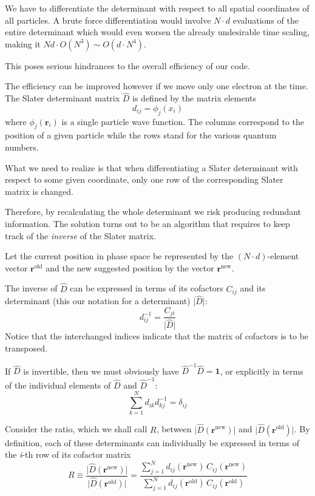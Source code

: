 We have to differentiate the determinant with respect to
all spatial coordinates of all particles. A brute force
differentiation would involve $N\cdot d$ evaluations of the entire
determinant which would even worsen the already undesirable time
scaling, making it $Nd\cdot O(N^3)\sim O(d\cdot N^4)$.

This poses serious hindrances to the overall efficiency of our code.

The efficiency can be improved however if we move only one electron at the time.
The Slater determinant matrix $\hat{D}$ is defined by the matrix elements
\[
d_{ij}=\phi_j(x_i)
\]
where $\phi_j(\mathbf{r}_i)$ is a single particle  wave function.
The columns correspond to the position of a given particle 
while the rows stand for the various quantum numbers.

What we need to realize is that when differentiating a Slater
determinant with respect to some given coordinate, only one row of the
corresponding Slater matrix is changed. 

Therefore, by recalculating
the whole determinant we risk producing redundant information. The
solution turns out to be an algorithm that requires to keep track of
the \emph{inverse} of the Slater matrix.

Let the current position in phase space be represented by the $(N\cdot d)$-element 
vector $\mathbf{r}^{\mathrm{old}}$ and the new suggested
position by the vector $\mathbf{r}^{\mathrm{new}}$.

The inverse of $\hat{D}$ can be expressed in terms of its
cofactors $C_{ij}$ and its determinant (this our notation for a determinant) $\vert\hat{D}\vert$:
\begin{equation}
d_{ij}^{-1} = \frac{C_{ji}}{\vert\hat{D}\vert}
\label{eq:inverse_cofactor}
\end{equation}
Notice that the interchanged indices indicate that the matrix of cofactors is to be transposed.

If $\hat{D}$ is invertible, then we must obviously have $\hat{D}^{-1}\hat{D}= \mathbf{1}$, or explicitly in terms of the individual
elements of $\hat{D}$ and $\hat{D}^{-1}$:
\begin{equation}
\sum_{k=1}^N d_{ik}^{\phantom X}d_{kj}^{-1} = \delta_{ij}^{\phantom X}
\label{eq:unity_explicitely}
\end{equation}

Consider the ratio, which we shall call $R$, between $\vert\hat{D}(\mathbf{r}^{\mathrm{new}})\vert$ and $\vert\hat{D}(\mathbf{r}^{\mathrm{old}})\vert$. 
By definition, each of these determinants can
individually be expressed in terms of the \emph{i}-th row of its cofactor
matrix
\begin{equation}
R\equiv\frac{\vert\hat{D}(\mathbf{r}^{\mathrm{new}})\vert}
{\vert\hat{D}(\mathbf{r}^{\mathrm{old}})\vert} =
\frac{\sum_{j=1}^N d_{ij}(\mathbf{r}^{\mathrm{new}})\,
C_{ij}(\mathbf{r}^{\mathrm{new}})}
{\sum_{j=1}^N d_{ij}(\mathbf{r}^{\mathrm{old}})\,
C_{ij}(\mathbf{r}^{\mathrm{old}})}
\label{eq:detratio_cofactors}
\end{equation}

